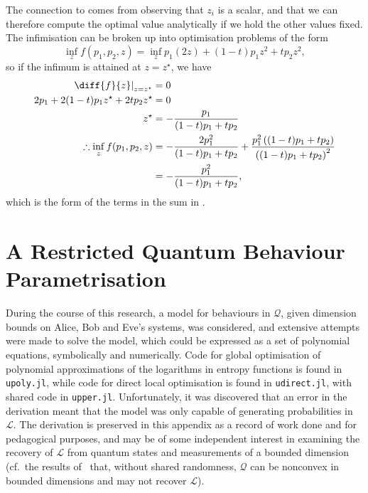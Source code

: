 \documentclass[10pt, a4paper]{article}
\numberwithin{equation}{section} %
\theoremstyle{definition}
\theoremstyle{plain}
\newcommand{\?}{\mathrel{?}} %
\newcommand{\Ls}{\mathcal{L}}
\newcommand{\Qs}{\mathcal{Q}}
\begin{document}
\begin{appendices}
                          The connection to  comes from observing that \(z_i\) is a scalar, and that we can therefore compute the optimal value analytically if we hold the other values fixed. The infimisation can be broken up into optimisation problems of the form
                          \begin{equation}
                            \inf_z f(p_1, p_2, z) = \inf_z p_1(2z) + (1-t) p_1 z^2 + t p_2 z^2,
                          \end{equation}
                          so if the infimum is attained at \(z=z^{\star}\), we have
                          \begin{align}
                            \left. \diff{f}{z} \right|_{z=z^{\star}} &= 0 \\
                              2p_1 + 2(1-t) p_1 z^{\star} + 2t p_2 z^{\star} &= 0 \\
                              z^{\star} &= -\frac{p_1}{(1-t)p_1 + tp_2} \\
                              \therefore \inf_z f(p_1, p_2, z) &= -\frac{2p_1^2}{(1-t)p_1 + tp_2} + \frac{p_1^2 \left( (1-t)p_1 + tp_2 \right)}{{\left((1-t)p_1 + tp_2\right)}^2} \\
                                                               &= -\frac{p_1^2}{(1-t)p_1 + tp_2},
                            \end{align}
                            which is the form of the terms in the sum in .

                            \section{A Restricted Quantum Behaviour Parametrisation}\label{sec:wrongparam}

                            During the course of this research, a model for behaviours in \(\Qs\), given dimension bounds on Alice, Bob and Eve's systems, was considered, and extensive attempts were made to solve the model, which could be expressed as a set of polynomial equations, symbolically and numerically. Code for global optimisation of polynomial approximations of the logarithms in entropy functions is found in \verb`upoly.jl`, while code for direct local optimisation is found in \verb`udirect.jl`, with shared code in \verb`upper.jl`. Unfortunately, it was discovered that an error in the derivation meant that the model was only capable of generating probabilities in \(\Ls\). The derivation is preserved in this appendix as a record of work done and for pedagogical purposes, and may be of some independent interest in examining the recovery of \(\Ls\) from quantum states and measurements of a bounded dimension (cf.\ the results of~\cite{FiniteDimNonconvex} that, without shared randomness, \(\Qs\) can be nonconvex in bounded dimensions and may not recover \(\Ls\)).


\end{appendices}
\end{document}
